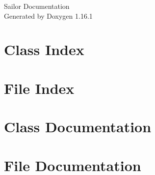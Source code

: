 \documentclass[twoside]{book}
\newcommand{\+}{\discretionary{\mbox{\scriptsize$\hookleftarrow$}}{}{}}
\newcommand{\clearemptydoublepage}{%
    \newpage{\pagestyle{empty}\cleardoublepage}%
  }
\begin{document}
  \raggedbottom
    \hypersetup{pageanchor=false,
                bookmarksnumbered=true,
                pdfencoding=unicode
               }
  \begin{titlepage}
  \vspace*{7cm}
  \begin{center}%
  {\Large Sailor Documentation}\\
  \vspace*{1cm}
  {\large Generated by Doxygen 1.16.1}\\
  \end{center}
  \end{titlepage}
  \clearemptydoublepage
  \tableofcontents
  \clearemptydoublepage
  \hypersetup{pageanchor=true}

\chapter{Class Index}

\chapter{File Index}

\chapter{Class Documentation}

\chapter{File Documentation}







  \backmatter
  \newpage
  \clearemptydoublepage
  \printindex
\end{document}
